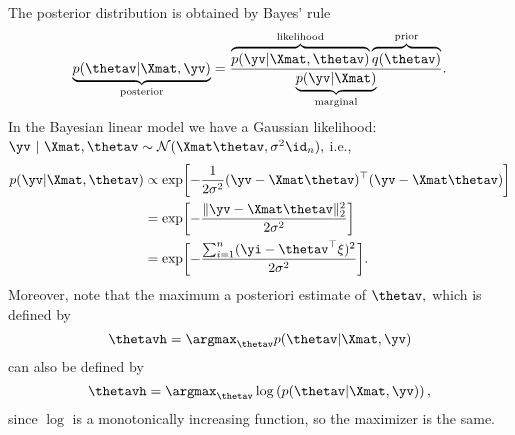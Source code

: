 
%
The posterior distribution is obtained by Bayes' rule 
%
$$
\underbrace{p(\thetav | \Xmat, \yv)}_{\text{posterior}} = \frac{\overbrace{p(\yv | \Xmat, \thetav)}^{\text{likelihood}}\overbrace{q(\thetav)}^{\text{prior}}}{\underbrace{p(\yv|\Xmat)}_{\text{marginal}}}. 
$$
% 
In the Bayesian linear model we have a Gaussian likelihood: $\yv ~|~ \Xmat, \thetav \sim \mathcal{N}(\Xmat \thetav, \sigma^2 \id_n),$ i.e.,
%
\begin{align*}
%	
	p(\yv | \Xmat, \thetav) 
%	
	&\propto	\exp\biggl[-\frac{1}{2\sigma^2}(\yv - \Xmat\thetav)^\top(\yv - \Xmat\thetav)\biggr] \\
%	
	&= \exp\biggl[-\frac{\| \yv - \Xmat\thetav \|_2^2}{2\sigma^2}\biggr] \\
%	
	&= \exp\biggl[-\frac{ \sum_{i=1}^n (\yi - \thetav^\top \xi)^2}{2\sigma^2}\biggr].
%	
\end{align*}
%
Moreover, note that the maximum a posteriori estimate of $\thetav,$ which is defined by
%
$$		\thetavh = \argmax_{\thetav} p(\thetav | \Xmat, \yv)	$$
%
can also be defined by 
%
%
$$		\thetavh = \argmax_{\thetav} \log \left( p(\thetav | \Xmat, \yv) \right),	$$
%
since $\log$ is a monotonically increasing function, so the maximizer is the same.
%
